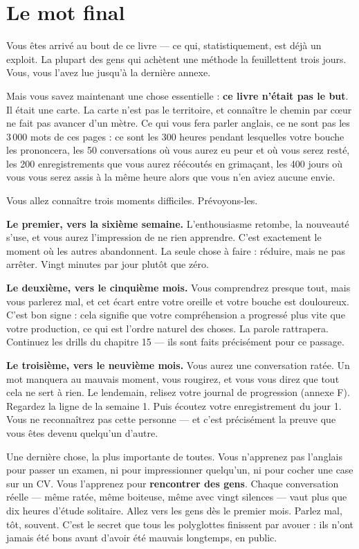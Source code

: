 \section{Le mot final}

Vous êtes arrivé au bout de ce livre --- ce qui, statistiquement, est déjà un exploit.
La plupart des gens qui achètent une méthode la feuillettent trois jours. Vous, vous l'avez
lue jusqu'à la dernière annexe.

Mais vous savez maintenant une chose essentielle : \textbf{ce livre n'était pas le but}.
Il était une carte. La carte n'est pas le territoire, et connaître le chemin par c\oe ur ne
fait pas avancer d'un mètre. Ce qui vous fera parler anglais, ce ne sont pas les 3\,000 mots
de ces pages : ce sont les 300 heures pendant lesquelles votre bouche les prononcera, les
50 conversations où vous aurez eu peur et où vous serez resté, les 200 enregistrements que
vous aurez réécoutés en grimaçant, les 400 jours où vous vous serez assis à la même heure
alors que vous n'en aviez aucune envie.

Vous allez connaître trois moments difficiles. Prévoyons-les.

\textbf{Le premier, vers la sixième semaine.} L'enthousiasme retombe, la nouveauté s'use,
et vous aurez l'impression de ne rien apprendre. C'est exactement le moment où les autres
abandonnent. La seule chose à faire : réduire, mais ne pas arrêter. Vingt minutes par jour
plutôt que zéro.

\textbf{Le deuxième, vers le cinquième mois.} Vous comprendrez presque tout, mais vous
parlerez mal, et cet écart entre votre oreille et votre bouche est douloureux. C'est bon
signe : cela signifie que votre compréhension a progressé plus vite que votre production,
ce qui est l'ordre naturel des choses. La parole rattrapera. Continuez les drills du
chapitre 15 --- ils sont faits précisément pour ce passage.

\textbf{Le troisième, vers le neuvième mois.} Vous aurez une conversation ratée. Un mot
manquera au mauvais moment, vous rougirez, et vous vous direz que tout cela ne sert à rien.
Le lendemain, relisez votre journal de progression (annexe F). Regardez la ligne de la
semaine 1. Puis écoutez votre enregistrement du jour 1. Vous ne reconnaîtrez pas cette
personne --- et c'est précisément la preuve que vous êtes devenu quelqu'un d'autre.

Une dernière chose, la plus importante de toutes. Vous n'apprenez pas l'anglais pour passer
un examen, ni pour impressionner quelqu'un, ni pour cocher une case sur un CV. Vous
l'apprenez pour \textbf{rencontrer des gens}. Chaque conversation réelle --- même ratée,
même boiteuse, même avec vingt silences --- vaut plus que dix heures d'étude solitaire.
Allez vers les gens dès le premier mois. Parlez mal, tôt, souvent. C'est le secret que tous
les polyglottes finissent par avouer : ils n'ont jamais été bons avant d'avoir été mauvais
longtemps, en public.

